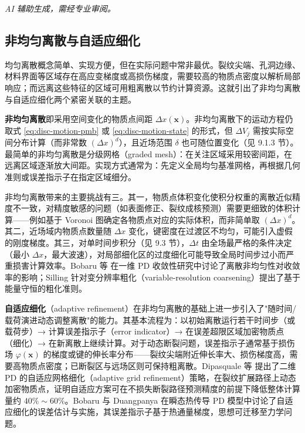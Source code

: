 \emph{AI 辅助生成，需经专业审阅。}

\subsection{非均匀离散与自适应细化}\label{sec:disc-nonuniform}

均匀离散概念简单、实现方便，但在实际问题中常非最优。裂纹尖端、孔洞边缘、材料界面等区域存在高应变梯度或高损伤梯度，需要较高的物质点密度以解析局部响应；而远离这些特征的区域可用粗离散以节约计算资源。这就引出了非均匀离散与自适应细化两个紧密关联的主题。

\textbf{非均匀离散}即采用空间变化的物质点间距 $\Delta x(\mathbf{x})$。非均匀离散下的运动方程仍取式 \eqref{eq:disc-motion-pmb} 或 \eqref{eq:disc-motion-state} 的形式，但 $\Delta V_j$ 需按实际空间分布计算（而非常数 $(\Delta x)^d$），且近场范围 $\delta$ 也可随位置变化（见 9.1.3 节）。最简单的非均匀离散是分级网格（graded mesh）：在关注区域采用较密间距，在远离区域逐渐放大间距。实现方式通常为：先定义全局均匀基准网格，再根据几何准则或误差指示子在指定区域细分。

非均匀离散带来的主要挑战有三。其一，物质点体积变化使积分权重的离散近似精度不一致，对精度敏感的问题（如表面修正、裂纹成核预测）需要更细致的体积计算——例如基于 Voronoi 图确定各物质点对应的实际体积，而非简单取 $(\Delta x)^d$。其二，近场域内物质点数量随 $\Delta x$ 变化，键密度在过渡区不均匀，可能引入虚假的刚度梯度。其三，对单时间步积分（见 9.3 节），$\Delta t$ 由全场最严格的条件决定（最小 $\Delta x$，最大波速），对局部细化区的过度细化可能导致全局时间步过小而严重损害计算效率。Bobaru 等 \cite{Bobaru2009} 在一维 PD 收敛性研究中讨论了离散非均匀性对收敛率的影响；Silling \cite{Silling2011coarsening} 针对变分辨率粗化（variable-resolution coarsening）提出了基于能量守恒的粗化准则。

\textbf{自适应细化}（adaptive refinement）在非均匀离散的基础上进一步引入了"随时间/载荷演进动态调整离散"的能力。其基本流程为：以初始离散运行若干时间步（或载荷步）→ 计算误差指示子（error indicator）→ 在误差超限区域加密物质点（细化）→ 在新离散上继续计算。对于动态断裂问题，误差指示子通常基于损伤场 $\varphi(\mathbf{x})$ 的梯度或键的伸长率分布——裂纹尖端附近伸长率大、损伤梯度高，需要高物质点密度；已断裂区与远场区则可保持粗离散。Dipasquale 等 \cite{Dipasquale2014} 提出了二维 PD 的自适应网格细化（adaptive grid refinement）策略，在裂纹扩展路径上动态加密物质点，证明自适应方案可在不损失断裂路径预测精度的前提下降低整体计算量约 $40\%\sim60\%$。Bobaru 与 Duangpanya \cite{BobaruDuangpanya2010} 在瞬态热传导 PD 模型中讨论了自适应细化的误差估计与实施，其误差指示子基于热通量梯度，思想可迁移至力学问题。

